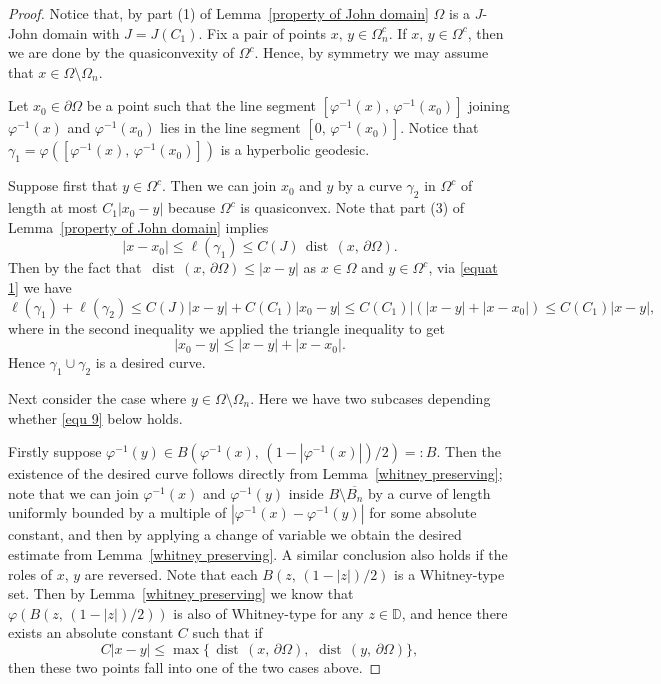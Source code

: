 \documentclass[reqno,11pt]{amsart}
\def\dist{{\mathop\mathrm{\,dist\,}}}
\numberwithin{equation}{section}
\theoremstyle{remark}
\begin{document}
\begin{proof}
Notice that, by  part (1) of Lemma~\ref{property of John domain} $\Omega$ is a $J$-John domain with $J=J(C_1)$.  
Fix a pair of points $x,\,y\in \Omega_n^c$. If $x,\,y\in \Omega^c$, then we are done by the quasiconvexity of $\Omega^c$. 
Hence, by symmetry we may assume that $x\in \Omega\setminus \Omega_n$. 


Let $x_0\in \partial \Omega$ be a point such that the line segment $[\varphi^{-1}(x),\,\varphi^{-1}(x_0)]$ joining $\varphi^{-1}(x)$ and $\varphi^{-1}(x_0)$ lies in the line segment $[0,\,\varphi^{-1}(x_0)]$. 
Notice that $\gamma_1=\varphi([\varphi^{-1}(x),\,\varphi^{-1}(x_0)])$ is a hyperbolic geodesic. 

Suppose first that  $y\in \Omega^c$. Then we can join $x_0$ and $y$ by a curve $\gamma_2$ in $\Omega^c$ of length at most $C_1|x_0-y|$ because $\Omega^c$ is quasiconvex. 
Note that part (3) of Lemma~\ref{property of John domain}    implies 
\begin{equation}\label{equat 1}
|x-x_0|\le \ell(\gamma_1)\le C(J) \dist(x,\,\partial \Omega).
\end{equation}
 Then  by the fact that $\dist(x,\,\partial \Omega)\le |x-y|$ as $ x\in \Omega$ and $y\in \Omega^c$, via \eqref{equat 1}
 we have
$$\ell(\gamma_1)+\ell(\gamma_2)\le C(J) |x-y| + C(C_1)|x_0-y|\le C(C_1)| (|x-y| + |x-x_0|)\le C(C_1)|x-y|, $$
where in the second inequality we applied the triangle inequality to get
$$|x_0-y|\le |x-y|+|x-x_0|.$$
Hence $\gamma_1\cup\gamma_2$ is a desired curve. 


Next consider the case where $y\in \Omega\setminus \Omega_n$. Here we have two subcases depending whether \eqref{equ 9} below holds. 

Firstly suppose $\varphi^{-1}(y)\in B(\varphi^{-1}(x),\,(1-|\varphi^{-1}(x)|)/2)=:B$. Then the existence of the desired curve follows directly from Lemma~\ref{whitney preserving}; note that we can join 
$\varphi^{-1}(x)$ and $\varphi^{-1}(y)$ inside $B\setminus \overline{B_n}$ by a curve of length uniformly bounded by a multiple of $|\varphi^{-1}(x)- \varphi^{-1}(y)|$ for some absolute constant, and then by applying a change of variable we obtain the desired estimate from Lemma~\ref{whitney preserving}. 
A similar conclusion also holds if the roles of $x,\,y$ are reversed.   Note that each $B(z,\,(1-|z|)/2)$ is a Whitney-type set. Then by Lemma~\ref{whitney preserving} we know that  $\varphi(B(z,\,(1-|z|)/2))$ is also of Whitney-type for any $z\in \mathbb D$, and hence there exists an absolute constant $C$ such that if 
$$C|x-y|\le \max \{\dist(x,\,\partial \Omega),\, \dist(y,\,\partial \Omega) \},$$
then these two points fall into  one of the two cases above. 


\end{proof}
\end{document}
